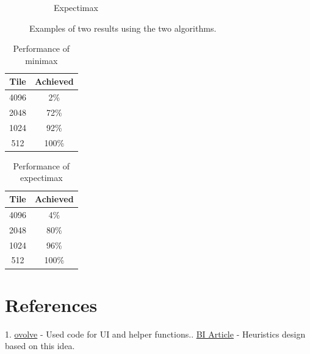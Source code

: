 \documentclass[english]{article}
\begin{document}
\begin{figure}[H]
\begin{subfigure}{.5\textwidth}
  \caption{Expectimax}
  \label{fig:sub2}
\end{subfigure}
\caption{Examples of two results using the two algorithms.}
\label{fig:test}
\end{figure}

\begin{table}[h!]
\centering
 \begin{tabular}{||c c||} 
 \hline
 Tile & Achieved \\ [2.0ex] 
 \hline\hline
 4096 & 2\% \\
 2048 & 72\% \\
 1024 & 92\% \\
 512 & 100\% \\ [1ex]
 \hline
 \end{tabular}
 \caption{Performance of minimax}
\end{table}

\begin{table}[h!]
\centering
 \begin{tabular}{||c c||} 
 \hline
 Tile & Achieved \\ [2.0ex] 
 \hline\hline
 4096 & 4\% \\
 2048 & 80\% \\
 1024 & 96\% \\
 512 & 100\% \\ [1ex]
 \hline
 \end{tabular}
 \caption{Performance of expectimax}
\end{table}

\section*{References}
1. \href{https://github.com/ovolve/2048-AI}{ovolve} - Used code for UI and helper functions.. \href{http://www.businessinsider.com/artificial-intelligence-crushed-all-human-records-in-the-addictive-tile-game-2048--heres-how-2015-5}{BI Article} - Heuristics design based on this idea. 
\end{document}
